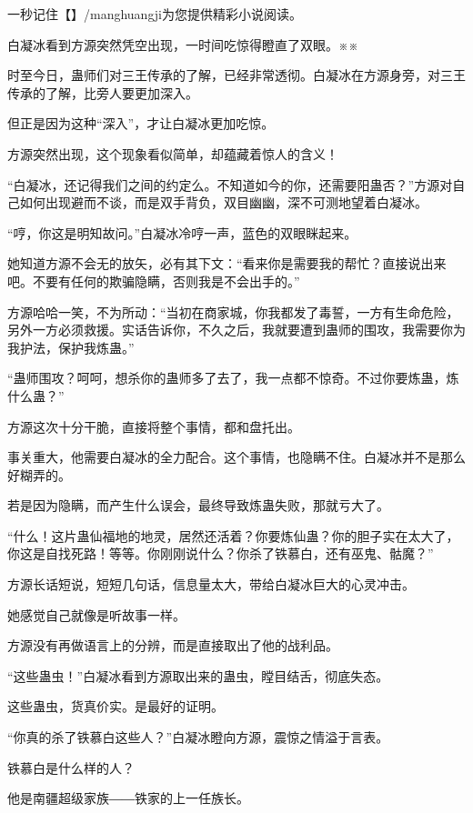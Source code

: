 
\begin{this_body}

一秒记住【】/manghuangji为您提供精彩小说阅读。

白凝冰看到方源突然凭空出现，一时间吃惊得瞪直了双眼。※※

时至今日，蛊师们对三王传承的了解，已经非常透彻。白凝冰在方源身旁，对三王传承的了解，比旁人要更加深入。

但正是因为这种“深入”，才让白凝冰更加吃惊。

方源突然出现，这个现象看似简单，却蕴藏着惊人的含义！

“白凝冰，还记得我们之间的约定么。不知道如今的你，还需要阳蛊否？”方源对自己如何出现避而不谈，而是双手背负，双目幽幽，深不可测地望着白凝冰。

“哼，你这是明知故问。”白凝冰冷哼一声，蓝色的双眼眯起来。

她知道方源不会无的放矢，必有其下文：“看来你是需要我的帮忙？直接说出来吧。不要有任何的欺骗隐瞒，否则我是不会出手的。”

方源哈哈一笑，不为所动：“当初在商家城，你我都发了毒誓，一方有生命危险，另外一方必须救援。实话告诉你，不久之后，我就要遭到蛊师的围攻，我需要你为我护法，保护我炼蛊。”

“蛊师围攻？呵呵，想杀你的蛊师多了去了，我一点都不惊奇。不过你要炼蛊，炼什么蛊？”

方源这次十分干脆，直接将整个事情，都和盘托出。

事关重大，他需要白凝冰的全力配合。这个事情，也隐瞒不住。白凝冰并不是那么好糊弄的。

若是因为隐瞒，而产生什么误会，最终导致炼蛊失败，那就亏大了。

“什么！这片蛊仙福地的地灵，居然还活着？你要炼仙蛊？你的胆子实在太大了，你这是自找死路！等等。你刚刚说什么？你杀了铁慕白，还有巫鬼、骷魔？”

方源长话短说，短短几句话，信息量太大，带给白凝冰巨大的心灵冲击。

她感觉自己就像是听故事一样。

方源没有再做语言上的分辨，而是直接取出了他的战利品。

“这些蛊虫！”白凝冰看到方源取出来的蛊虫，瞠目结舌，彻底失态。

这些蛊虫，货真价实。是最好的证明。

“你真的杀了铁慕白这些人？”白凝冰瞪向方源，震惊之情溢于言表。

铁慕白是什么样的人？

他是南疆超级家族――铁家的上一任族长。


\end{this_body}
